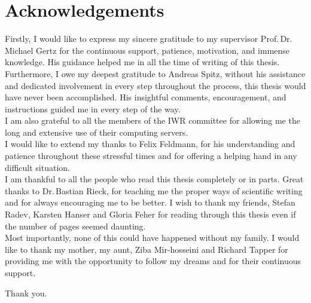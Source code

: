 \thispagestyle{empty}

\chapter*{Acknowledgements}

\noindent
%
Firstly, I would like to express my sincere gratitude to my supervisor Prof.\,Dr.\,Michael Gertz for the continuous support, patience, motivation, and immense knowledge. His guidance helped me in all the time of writing of this thesis.\\
Furthermore, I owe my deepest gratitude to Andreas Spitz, without his assistance and dedicated involvement in every step throughout the process, this thesis would have never been accomplished. His insightful comments, encouragement, and instructions guided me in every step of the way. \\
I am also grateful to all the members of the IWR committee for allowing me the long and extensive use of their computing servers.\\
I would like to extend my thanks to Felix Feldmann, for his understanding and patience throughout these stressful times and for offering a helping hand in any difficult situation.\\
I am thankful to all the people who read this thesis completely or in parts. Great thanks to Dr.\,Bastian Rieck, for teaching me the proper ways of scientific writing and for always encouraging me to be better. I wish to thank my friends, Stefan Radev, Karsten Hanser and Gloria Feher for reading through this thesis even if the number of pages seemed daunting. \\
Most importantly, none of this could have happened without my family. I would like to thank my mother, my aunt, Ziba Mir-hosseini and Richard Tapper for providing me with the opportunity to follow my dreams and for their continuous support. 
\begin{flushleft}
  Thank you.
\end{flushleft}

